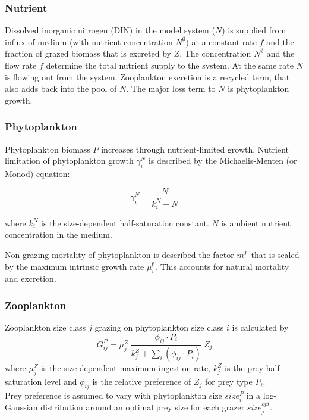 \documentclass[template.tex]{subfiles}
\begin{document}
\subsubsection{Nutrient}
Dissolved inorganic nitrogen (DIN) in the model system ($N$) is supplied from influx of medium (with nutrient concentration $N^\emptyset$) at a constant rate $f$ and the fraction of grazed biomass that is excreted by $Z$. The concentration $N^\emptyset$ and the flow rate $f$ determine the total nutrient supply to the system. At the same rate $N$ is flowing out from the system. Zooplankton excretion is a recycled term, that also adds back into the pool of $N$. The major loss term to $N$ is phytoplankton growth.

\subsubsection{Phytoplankton}
Phytoplankton biomass $P$ increases through  nutrient-limited growth. Nutrient limitation of phytoplankton growth $\gamma_i^N$ is described by the Michaelis-Menten (or Monod) equation:

\begin{equation}
    \gamma_i^N =  \frac{N}{k_i^N + N} 
\end{equation}

where $k_i^N$ is the size-dependent half-saturation constant. $N$ is ambient nutrient concentration in the medium.

Non-grazing mortality of phytoplankton is described the factor $m^P$ that is scaled by the maximum intrinsic growth rate $\mu_i^{\emptyset}$. This accounts for natural mortality and excretion.

\subsubsection{Zooplankton}
Zooplankton size class $j$ grazing on phytoplankton size class $i$ is calculated by
\begin{equation}
    G_{ij}^P = \mu_j^Z \ \frac{ \phi_{ij} \cdot P_i }{ k_j^Z + \sum_{i}(\phi_{ij} \cdot P_i) } \ Z_j
\end{equation}
where $\mu_j^Z$ is the size-dependent maximum ingestion rate, $k_j^Z$ is the prey half-saturation level and $\phi_{ij}$ is the relative preference of $Z_j$ for prey type $P_i$.\\

Prey preference is assumed to vary with phytoplankton size $size_i^{P}$ in a log-Gaussian distribution around an optimal prey size for each grazer $size_j^{opt}$.
\end{document}
